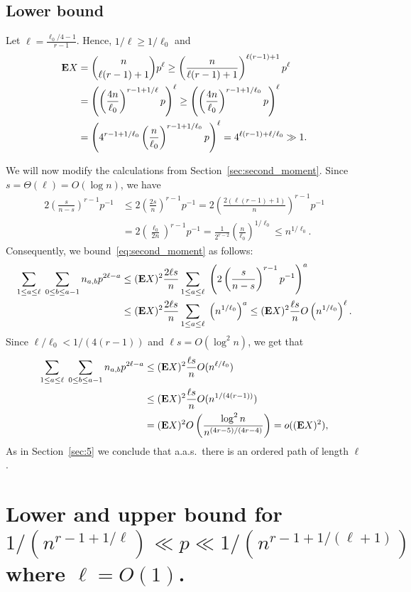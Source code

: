\documentclass[12pt,reqno]{amsart}
\theoremstyle{remark}
\def\E{\mbox{{\bf E}}}
\def\E{\mbox{{\bf E}}}
\begin{document}
\subsection{Lower bound}
Let $\ell =  \frac{\ell_0/4 - 1}{r-1}$. Hence, $1/\ell \ge 1/\ell_0$ and 
\begin{align*}
\E X &= \binom{n}{\ell(r-1)+1}p^\ell
\ge \left(\frac{n}{\ell(r-1)+1}\right)^{\ell(r-1)+1}p^\ell\\
&= \left(\left(\frac{4n}{\ell_0}\right)^{r-1+1/\ell}p\right)^\ell
\ge \left(\left(\frac{4n}{\ell_0}\right)^{r-1+1/\ell_0}p\right)^\ell\\
&= \left(4^{r-1+1/\ell_0} \left(\frac{n}{\ell_0}\right)^{r-1+1/\ell_0}p\right)^\ell
= 4^{\ell(r-1)+\ell/\ell_0} \gg 1.
\end{align*}

We will now modify the calculations from Section~\ref{sec:second_moment}. Since $s=\Theta(\ell) = O(\log n)$, we have
\begin{align*}
2\left(\frac{s}{n-s}\right)^{r-1} p^{-1} 
&\le 2\left(\frac{2s}{n}\right)^{r-1} p^{-1}
= 2\left(\frac{2(\ell(r-1)+1)}{n}\right)^{r-1} p^{-1}\\
&= 2\left(\frac{\ell_0}{2n}\right)^{r-1} p^{-1}
= \frac{1}{2^{r-2}}\left(\frac{n}{\ell_0}\right)^{1/\ell_0}
\le n^{1/\ell_0}.
\end{align*}
Consequently, we bound~\eqref{eq:second_moment} as follows:
\begin{align*}
\sum_{1\le a \le \ell}\; \sum_{0\le b \le a-1} n_{a,b} p^{2\ell-a}
&\le (\E X)^2 \frac{2\ell s}{n} \sum_{1\le a \le \ell}\; \left(2 \left(\frac{s}{n-s}\right)^{r-1} p^{-1} \right)^a\\
&\le (\E X)^2 \frac{2\ell s}{n} \sum_{1\le a \le \ell}\; \left( n^{1/\ell_0} \right)^a
\le (\E X)^2 \frac{\ell s}{n} O\left( n^{1/\ell_0} \right)^\ell.
\end{align*}
Since $\ell/\ell_0 < 1/(4(r-1))$ and $\ell s = O(\log^2 n)$, we get that 
\begin{align*}
\sum_{1\le a \le \ell}\; \sum_{0\le b \le a-1} n_{a,b} p^{2\ell-a}
&\le (\E X)^2 \frac{\ell s}{n} O(n^{\ell/\ell_0})\\
&\le (\E X)^2 \frac{\ell s}{n}O(n^{1/(4(r-1))})\\
&= (\E X)^2 O\left(\frac{\log^2 n}{n^{(4r-5)/(4r-4)}}\right)
= o((\E X)^2),
\end{align*}
As in Section~\ref{sec:5} we conclude that a.a.s.\ there is an ordered path of length $\ell$.

\section{Lower and upper bound for $1/(n^{r-1+1/\ell}) \ll p \ll 1/(n^{r-1+1/(\ell+1)})$ where $\ell=O(1)$.}\label{sec:8a}
\end{document}
